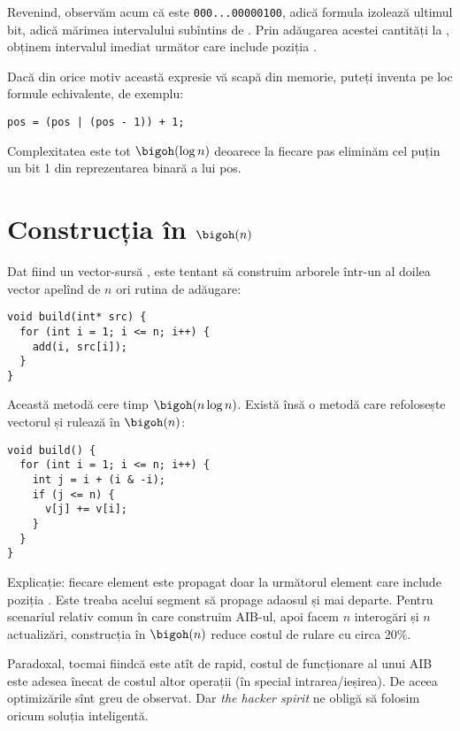 Revenind, observăm acum că  este \texttt{000...00000100}, adică formula  izolează ultimul bit, adică mărimea intervalului subîntins de . Prin adăugarea acestei cantități la , obținem intervalul imediat următor care include poziția .

Dacă din orice motiv această expresie vă scapă din memorie, puteți inventa pe loc formule echivalente, de exemplu:

\begin{verbatim}
pos = (pos | (pos - 1)) + 1;
\end{verbatim}

Complexitatea este tot $\bigoh(\log n)$ deoarece la fiecare pas eliminăm cel puțin un bit 1 din reprezentarea binară a lui pos.

\section{Construcția în \texorpdfstring{$\bigoh(n)$}{O(n)}}

Dat fiind un vector-sursă , este tentant să construim arborele într-un al doilea vector apelînd de $n$ ori rutina de adăugare:

\begin{verbatim}
void build(int* src) {
  for (int i = 1; i <= n; i++) {
    add(i, src[i]);
  }
}
\end{verbatim}

Această metodă cere timp $\bigoh(n \log n)$. Există însă o metodă care refolosește vectorul și rulează în $\bigoh(n)$:

\begin{verbatim}
void build() {
  for (int i = 1; i <= n; i++) {
    int j = i + (i & -i);
    if (j <= n) {
      v[j] += v[i];
    }
  }
}
\end{verbatim}

Explicație: fiecare element  este propagat doar la următorul element  care include poziția . Este treaba acelui segment să propage adaosul și mai departe. Pentru scenariul relativ comun în care construim AIB-ul, apoi facem $n$ interogări și $n$ actualizări, construcția în $\bigoh(n)$ reduce costul de rulare cu circa 20\%.

Paradoxal, tocmai fiindcă este atît de rapid, costul de funcționare al unui AIB este adesea înecat de costul altor operații (în special intrarea/ieșirea). De aceea optimizările sînt greu de observat. Dar \textit{the hacker spirit} ne obligă să folosim oricum soluția inteligentă.

